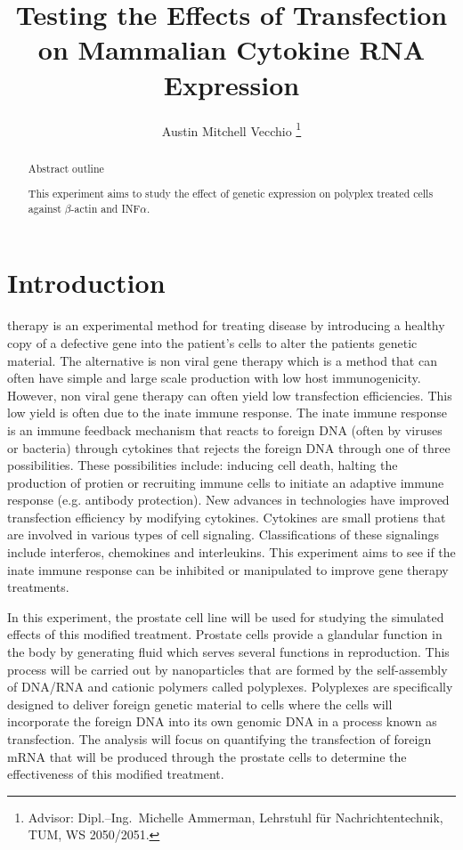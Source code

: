 \documentclass[journal, a4paper]{IEEEtran}
\begin{document}
\title{Testing the Effects of Transfection on Mammalian Cytokine RNA Expression}
\author{Austin Mitchell Vecchio
\thanks{Advisor: Dipl.--Ing.~Michelle Ammerman, Lehrstuhl f\"ur Nachrichtentechnik, TUM, WS 2050/2051.}}
\maketitle

\begin{abstract}
  Abstract outline

  This experiment aims to study the effect of genetic expression on polyplex treated cells against $\beta$-actin and INF$\alpha$.

\end{abstract}

\section{Introduction}
   therapy is an experimental method for treating disease by introducing a healthy copy of a
  defective gene into the patient's cells to alter the patients genetic material.
  The alternative is  non viral gene therapy which is a method that can often have simple and large scale production
  with low host immunogenicity. However, non viral gene therapy can often yield low transfection efficiencies.
  This low yield is often due to the inate immune response. The inate immune response is an immune feedback mechanism
  that reacts to foreign DNA (often by viruses or bacteria) through cytokines that rejects the foreign DNA through one of three possibilities.
  These possibilities include: inducing cell death, halting the production of protien or recruiting immune cells to initiate an adaptive immune
  response (e.g. antibody protection). New advances in technologies have improved transfection efficiency by modifying cytokines. Cytokines
  are small protiens that are involved in various types of cell signaling. Classifications of these signalings
  include interferos, chemokines and interleukins. This experiment aims to see if the inate immune response can be inhibited or manipulated
  to improve gene therapy treatments.

  In this experiment, the prostate cell line will be used for studying the simulated effects of this modified treatment. Prostate cells provide a glandular function
  in the body by generating fluid which serves several functions in reproduction.
  This process will be carried out by nanoparticles that are formed by the self-assembly of DNA/RNA and cationic polymers
  called polyplexes. Polyplexes are specifically designed to deliver foreign genetic material to cells where the cells will incorporate
  the foreign DNA into its own genomic DNA in a process known as transfection.
  The analysis will focus on quantifying the transfection of foreign
  mRNA that will be produced through the prostate cells to determine the effectiveness of this modified treatment.
\end{document}
